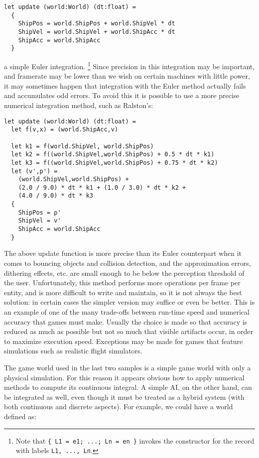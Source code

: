 \begin{lstlisting}
let update (world:World) (dt:float) = 
  { 
    ShipPos = world.ShipPos + world.ShipVel * dt
    ShipVel = world.ShipVel + world.ShipAcc * dt
    ShipAcc = world.ShipAcc
  }
\end{lstlisting}

 a simple Euler integration. \footnote{Note that \texttt{\{ L1 = e1; ...; Ln = en \}} invokes the constructor for the record with labels \texttt{L1, ..., Ln}.} Since precision in this integration may be important, and framerate may be lower than we wish on certain machines with little power, it may sometimes happen that integration with the Euler method actually fails and accumulates odd errors. To avoid this it is possible to use a more precise numerical integration method, such as Ralston's: 

\begin{lstlisting}
let update (world:World) (dt:float) =
  let f(v,x) = (world.ShipAcc,v)

  let k1 = f(world.ShipVel, world.ShipPos)
  let k2 = f((world.ShipVel,world.ShipPos) + 0.5 * dt * k1)
  let k3 = f((world.ShipVel,world.ShipPos) + 0.75 * dt * k2)
  let (v',p') = 
    (world.ShipVel,world.ShipPos) + 
    (2.0 / 9.0) * dt * k1 + (1.0 / 3.0) * dt * k2 + 
    (4.0 / 9.0) * dt * k3
  {
    ShipPos = p'
    ShipVel = v'
    ShipAcc = world.ShipAcc
  }
\end{lstlisting}

The above update function is more precise than its Euler counterpart when it comes to bouncing objects and collision detection, and the approximation errors, dithering effects, etc. are small enough to be below the perception threshold of the user. Unfortunately, this method performs more operations per frame per entity, and is more difficult to write and maintain, so it is not always the best solution: in certain cases the simpler version may suffice or even be better. This is an example of one of the many trade-offs between run-time speed and numerical accuracy that games must make. Usually the choice is made so that accuracy is reduced as much as possible but not so much that visible artifacts occur, in order to maximize execution speed. Exceptions may be made for games that feature simulations such as realistic flight simulators.

The game world used in the last two samples is a simple game world with only a physical simulation. For this reason it appears obvious how to apply numerical methods to compute its continuous integral. A simple AI, on the other hand, can be integrated as well, even though it must be treated as a hybrid system (with both continuous and discrete aspects). For example, we could have a world defined as:

